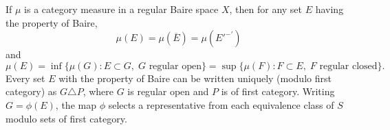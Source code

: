 If $\mu$ is a category measure in a regular Baire space $X$, then for any set $E$ having the property of Baire,
$$\mu(E) = \mu(\overline{E}) = \mu(E'^{-'})$$
and
$$\mu(E) = \inf\{\mu(G) : E \subset G,\; G \text{ regular open}\} = \sup\{\mu(F) : F \subset E,\; F \text{ regular closed}\}.$$
Every set $E$ with the property of Baire can be written uniquely (modulo first category) as $G \triangle P$, where $G$ is regular open and $P$ is of first category. Writing $G = \phi(E)$, the map $\phi$ selects a representative from each equivalence class of $S$ modulo sets of first category.
